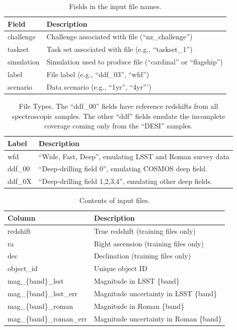 \documentclass[11pt,twoside,letterpaper,onecolumn,english]{article}
\begin{document}
\begin{table}[ht]
\centering
\caption{\label{tab:file_fields}\small Fields in the input file names.}
\begin{tabular}{ll}
  \hline\hline  
  Field & Description \\ \hline
  challenge & Challenge associated with file (``nz\_challenge'') \\
  taskset & Task set associated with file (e.g., ``taskset\_1'') \\
  simulation & Simulation used to produce file (``cardinal'' or ``flagship'') \\
  label & File label (e.g., ``ddf\_03'', ``wfd'') \\
  scenario & Data scenario (e.g., ``1yr'', ``4yr''') \\
\hline\hline
\end{tabular}
\end{table}


\begin{table}[ht]
\centering
\caption{\label{tab:file_types}\small File Types.  The ``ddf\_00'' fields have reference redshifts
  from all spectroscopic samples.  The other ``ddf'' fields emulate the incomplete coverage coming only
  from the ``DESI'' samples.}
\begin{tabular}{ll}
  \hline\hline  
  Label & Description \\ \hline
  wfd & ``Wide, Fast, Deep'', emulating LSST and Roman survey data \\
  ddf\_00 & ``Deep-drilling field 0'', emulating COSMOS deep field. \\
  ddf\_0X & ``Deep-drilling field 1,2,3,4'', emulating other deep fields. \\  
\hline\hline
\end{tabular}
\end{table}


\begin{table}[ht]
\centering
\caption{\label{tab:columns}\small Contents of input files.}
\begin{tabular}{ll}
  \hline\hline
  Column & Description \\ \hline  
  redshift & True redshift (training files only) \\
  ra & Right ascension (training files only) \\
  dec & Declination (training files only) \\
  object\_id & Unique object ID\\
  mag\_\{band\}\_lsst & Magnitude in LSST \{band\} \\
  mag\_\{band\}\_lsst\_err & Magnitude uncertainty in LSST \{band\} \\
  mag\_\{band\}\_roman & Magnitude in Roman \{band\} \\
  mag\_\{band\}\_roman\_err & Magnitude uncertainty in Roman \{band\} \\
\hline\hline
\end{tabular}
\end{table}
\end{document}
